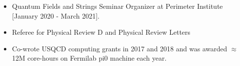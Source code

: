 \renewcommand{\arraystretch}{1.1}

	\begin{itemize}
	 \item Quantum Fields and Strings Seminar Organizer at Perimeter Institute [January 2020 - March 2021].
	  \item Referee for Physical Review D and Physical Review Letters %
	  \item Co-wrote USQCD computing grants in 2017 and 2018 and was awarded $\approx$ 12M core-hours on Fermilab pi0 machine each year.
	  \end{itemize}
